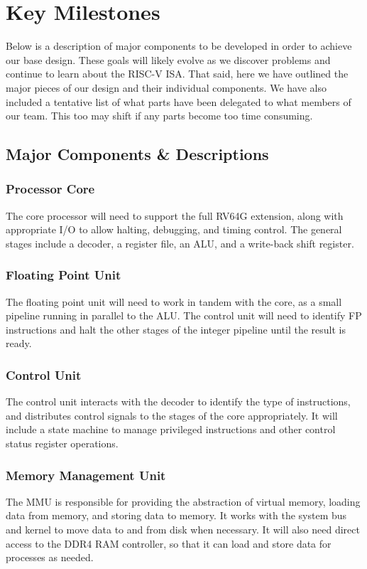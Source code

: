 \documentclass{article}
\begin{document}
\section{Key Milestones}
Below is a description of major components to be developed in order to achieve our base design.  These goals will likely evolve as we discover problems and continue to learn about the RISC-V ISA.  That said, here we have outlined the major pieces of our design and their individual components.  We have also included a tentative list of what parts have been delegated to what members of our team.  This too may shift if any parts become too time consuming.

\subsection{Major Components \& Descriptions}

    \subsubsection{Processor Core}
    The core processor will need to support the full RV64G extension, along with appropriate I/O to allow halting, debugging, and timing control.  The general stages include a decoder, a register file, an ALU, and a write-back shift register.
    
    \subsubsection{Floating Point Unit}
    The floating point unit will need to work in tandem with the core, as a small pipeline running in parallel to the ALU.  The control unit will need to identify FP instructions and halt the other stages of the integer pipeline until the result is ready.
    
    \subsubsection{Control Unit}
    The control unit interacts with the decoder to identify the type of instructions, and distributes control signals to the stages of the core appropriately.  It will include a state machine to manage privileged instructions and other control status register operations.
    
    \subsubsection{Memory Management Unit}
    The MMU is responsible for providing the abstraction of virtual memory, loading data from memory, and storing data to memory.  It works with the system bus and kernel to move data to and from disk when necessary.  It will also need direct access to the DDR4 RAM controller, so that it can load and store data for processes as needed.
    
\end{document}
